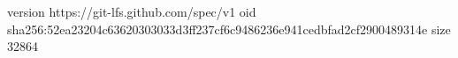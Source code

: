 version https://git-lfs.github.com/spec/v1
oid sha256:52ea23204c63620303033d3ff237cf6c9486236e941cedbfad2cf2900489314e
size 32864
